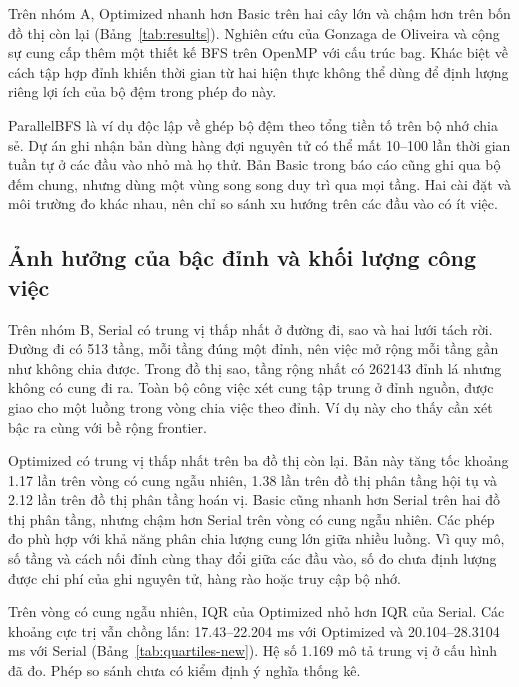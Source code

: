 Trên nhóm A, Optimized nhanh hơn Basic trên hai cây lớn và chậm hơn trên bốn đồ thị còn lại (Bảng~\ref{tab:results}). Nghiên cứu của Gonzaga de Oliveira và cộng sự \cite{oliveira2024} cung cấp thêm một thiết kế BFS trên OpenMP với cấu trúc bag. Khác biệt về cách tập hợp đỉnh khiến thời gian từ hai hiện thực không thể dùng để định lượng riêng lợi ích của bộ đệm trong phép đo này.

ParallelBFS \cite{parallelbfs} là ví dụ độc lập về ghép bộ đệm theo tổng tiền tố trên bộ nhớ chia sẻ. Dự án ghi nhận bản dùng hàng đợi nguyên tử có thể mất \num{10}--\num{100} lần thời gian tuần tự ở các đầu vào nhỏ mà họ thử. Bản Basic trong báo cáo cũng ghi qua bộ đếm chung, nhưng dùng một vùng song song duy trì qua mọi tầng. Hai cài đặt và môi trường đo khác nhau, nên chỉ so sánh xu hướng trên các đầu vào có ít việc.

\subsection{Ảnh hưởng của bậc đỉnh và khối lượng công việc}
Trên nhóm B, Serial có trung vị thấp nhất ở đường đi, sao và hai lưới tách rời. Đường đi có 513 tầng, mỗi tầng đúng một đỉnh, nên việc mở rộng mỗi tầng gần như không chia được. Trong đồ thị sao, tầng rộng nhất có \num{262143} đỉnh lá nhưng không có cung đi ra. Toàn bộ công việc xét cung tập trung ở đỉnh nguồn, được giao cho một luồng trong vòng chia việc theo đỉnh. Ví dụ này cho thấy cần xét bậc ra cùng với bề rộng frontier.

Optimized có trung vị thấp nhất trên ba đồ thị còn lại. Bản này tăng tốc khoảng \num{1.17} lần trên vòng có cung ngẫu nhiên, \num{1.38} lần trên đồ thị phân tầng hội tụ và \num{2.12} lần trên đồ thị phân tầng hoán vị. Basic cũng nhanh hơn Serial trên hai đồ thị phân tầng, nhưng chậm hơn Serial trên vòng có cung ngẫu nhiên. Các phép đo phù hợp với khả năng phân chia lượng cung lớn giữa nhiều luồng. Vì quy mô, số tầng và cách nối đỉnh cùng thay đổi giữa các đầu vào, số đo chưa định lượng được chi phí của ghi nguyên tử, hàng rào hoặc truy cập bộ nhớ.

Trên vòng có cung ngẫu nhiên, IQR của Optimized nhỏ hơn IQR của Serial. Các khoảng cực trị vẫn chồng lấn: \num{17.43}--\num{22.204} ms với Optimized và \num{20.104}--\num{28.3104} ms với Serial (Bảng~\ref{tab:quartiles-new}). Hệ số \num{1.169} mô tả trung vị ở cấu hình đã đo. Phép so sánh chưa có kiểm định ý nghĩa thống kê.

